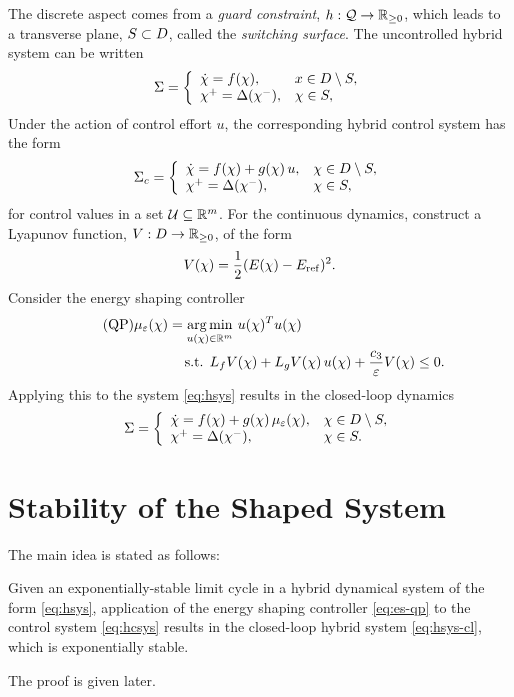 \documentclass[twocolumn]{article}
\begin{document}
The discrete aspect comes from a {\em guard constraint}, $h : \mathcal{Q} \to \mathbb{R}_{\geq 0}$, which leads to a transverse plane, $S \subset D$, called the {\em switching surface}.
%
The uncontrolled hybrid system can be written
\begin{align}
  \Sigma = \left\{
  \begin{array}{l l}
    {\dot {\chi}} = f(\chi), & x \in D \setminus S,\\
    \chi^{+} = \Delta(\chi^{-}), &\chi \in S,
  \end{array}\right.
  \label{eq:hsys}
\end{align}
Under the action of control effort $u$, the corresponding hybrid control system has the form
\begin{align}
  \Sigma_{c} = \left\{
  \begin{array}{l l}
    {\dot {\chi}} = f(\chi) + g(\chi) \, u, & \chi \in D \setminus S,\\
    \chi^{+} = \Delta(\chi^{-}), & \chi \in S,
  \end{array}\right.
  \label{eq:hcsys}
\end{align}
for control values in a set $\mathcal{U} \subseteq \mathbb{R}^{m}$.
%
For the continuous dynamics, construct a Lyapunov function, $V : D \to \mathbb{R}_{\geq 0}$, of the form
\begin{align}
  \label{eq:lyap}
  V(\chi) = \frac{1}{2} (E(\chi) - E_{\mathrm{ref}})^2.
\end{align}
Consider the energy shaping controller
\begin{align}
  \label{eq:es-qp} \tag {QP}
  \mu_{\varepsilon}(\chi) = \operatorname*{arg\,min}_{u(\chi) \in \mathbb{R}^{m}} \ & u(\chi)^T u(\chi)\\
  \nonumber
  \mbox{s.t. } L_{f} V&(\chi) + L_{g} V(\chi) \, u(\chi) + \frac{c_{3}}{\varepsilon} V(\chi) \leq 0.
\end{align}
Applying this to the system \eqref{eq:hsys} results in the closed-loop dynamics
\begin{align}
  \label{eq:hsys-cl}
  \Sigma = \left\{
  \begin{array}{l l}
    {\dot {\chi}} = f(\chi) + g(\chi) \, \mu_{\varepsilon}(\chi), & \chi \in D \setminus S,\\
    \chi^{+} = \Delta(\chi^{-}), &\chi \in S.
  \end{array}\right.
\end{align}

\section{Stability of the Shaped System}

The main idea is stated as follows:
%
\begin{theorem}
  Given an exponentially-stable limit cycle in a hybrid dynamical system of the form \eqref{eq:hsys}, application of the energy shaping controller \eqref{eq:es-qp} to the control system \eqref{eq:hcsys} results in the closed-loop hybrid system \eqref{eq:hsys-cl}, which is exponentially stable.
\end{theorem}
%
The proof is given later.
\end{document}
